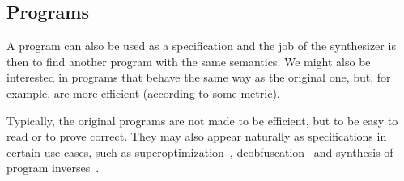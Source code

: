 \subsection{Programs}
\label{sec:programs}

A program can also be used as a specification and the job of the synthesizer is
then to find another program with the same semantics. We might also be
interested in programs that behave the same way as the original one, but, for
example, are more efficient (according to some metric).

Typically, the original programs are not made to be efficient, but to be easy to
read or to prove correct. They may also appear naturally as specifications in
certain use cases, such as
superoptimization~\cite{Phothilimthana:2016:SUS},
deobfuscation~\cite{Jha:oracle:2010} and
synthesis of program inverses~\cite{Srivastava:2011:PIS}.
